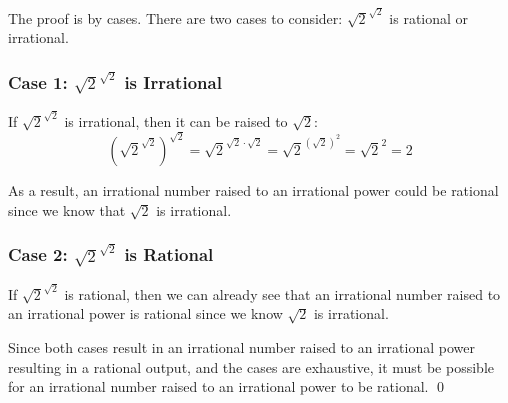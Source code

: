 \documentclass{article}
\begin{document}
The proof is by cases. There are two cases to consider: $\sqrt{2}^{\sqrt{2}}$ is
rational or irrational.

\subsubsection*{Case 1: $\sqrt{2}^{\sqrt{2}}$ is Irrational}

If $\sqrt{2}^{\sqrt{2}}$ is irrational, then it can be raised to $\sqrt{2}$:
$$ \left( \sqrt{2}^{\sqrt{2}} \right)^{\sqrt{2}} = \sqrt{2}^{\sqrt{2} \cdot
\sqrt{2}} = \sqrt{2}^{(\sqrt{2})^{2}} =
\sqrt{2}^{2} = 2 $$

As a result, an irrational number raised to an irrational power could be
rational since we know that $\sqrt{2}$ is irrational.

\subsubsection*{Case 2: $\sqrt{2}^{\sqrt{2}}$ is Rational }

If $\sqrt{2}^{\sqrt{2}}$ is rational, then we can already see that an irrational
number raised to an irrational power is rational since we know $\sqrt{2}$ is
irrational.

\bigbreak

Since both cases result in an irrational number raised to an irrational power
resulting in a rational output, and the cases are exhaustive, it must be
possible for an irrational number raised to an irrational power to be rational.
\qed
\end{document}
